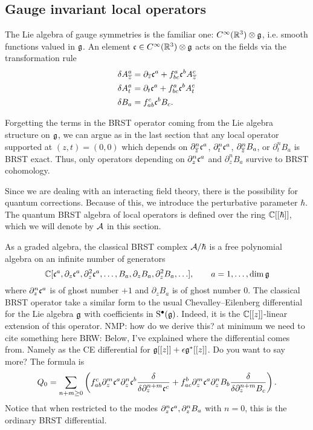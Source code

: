 \documentclass[11pt]{amsart}
\def\brian#1{{\textcolor{blue!65!red}{BRW: {#1}}}}
\def\natalie#1{{\textcolor{green!65!black}{NMP: {#1}}}}
\begin{document}
\subsection{Gauge invariant local operators}

The Lie algebra of gauge symmetries is the familiar one: $C^\infty(\mathbb R^3) \otimes \mathfrak g$, i.e. smooth functions valued in $\mathfrak g$. 
An element $\mathfrak c \in C^\infty(\mathbb R^3) \otimes \mathfrak g$ acts on the fields via the transformation rule
\begin{align*}
\delta A^a_{\overline{z}} & = \partial_{{\overline{z}}} \mathfrak c^a + f^a_{bc} \mathfrak c^b A^c_{\overline{z}} \\
\delta A^a_t & = \partial_t \mathfrak c^a + f^a_{bc} \mathfrak c^b A^c_t  \\
\delta B_a & = f^c_{ab} \mathfrak c^b B_c .
\end{align*}

Forgetting the terms in the BRST operator coming from the Lie algebra structure on $\mathfrak g$, we can argue as in the last section that any local operator supported at $(z,t) = (0,0)$ which depends on $\partial^n_{{\overline{z}}} \mathfrak c^a$, $\partial^n_t \mathfrak c^a$, $\partial^n_{{\overline{z}}} B_a$, or $\partial^n_t B_a$ is BRST exact. 
Thus, only operators depending on $\partial_z^n \mathfrak c^a$ and $\partial^n_z B_a$ survive to BRST cohomology.

Since we are dealing with an interacting field theory, there is the possibility for quantum corrections.  
Because of this, we introduce the perturbative parameter $\hbar$. 
The quantum BRST algebra of local operators is defined over the ring $\mathbb C[[\hbar]]$, which we will denote by $\mathcal A$ in this section. 

As a graded algebra, the classical BRST complex $\mathcal A / \hbar$ is a free polynomial algebra on an infinite number of generators
\[
\mathbb C[\mathfrak c^a, \partial_z \mathfrak c^a , \partial^2_z \mathfrak c^a, \ldots, B_a , \partial_z B_a , \partial_z^2 B_a, \ldots], \qquad {a=1, \ldots, \dim \mathfrak g} 
\]
where $\partial_z^n \mathfrak c^a$ is of ghost number $+1$ and $\partial_z B_a$ is of ghost number $0$. 
The classical BRST operator take a similar form to the usual Chevalley--Eilenberg differential for the Lie algebra $\mathfrak g$ with coefficients in ${\rm S}^\bullet (\mathfrak g)$. 
Indeed, it is the $\mathbb C[[z]]$-linear extension of this operator. \natalie{how do we derive this? at minimum we need to cite something here}
\brian{Below, I've explained where the differential comes from. 
Namely as the CE differential for $\mathfrak g[[z]] + \epsilon \mathfrak g^*[[z]]$.
Do you want to say more?}
The formula is
\[
Q_0 = \sum_{n +m \geq 0} \left(f_{ab}^c \partial_z^m \mathfrak c^a \partial_z^n \mathfrak c^b \frac{\delta}{\delta \partial_z^{n+m}\mathfrak c^c} + f_{ac}^b \partial_{z}^m \mathfrak c^a \partial_z^n B_b \frac{\delta}{\delta \partial_z^{n+m} B_c}\right) .
\] 
Notice that when restricted to the modes $\partial_z^n \mathfrak c^a, \partial_z^n B_a$ with $n=0$, this is the ordinary BRST differential. 
\end{document}
